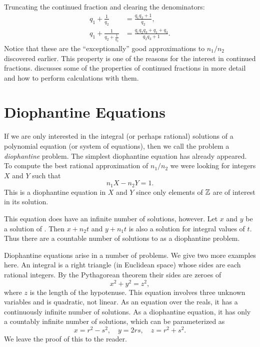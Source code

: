 Truncating the continued fraction and clearing the denominators:
\[
\begin{aligned}
q_1 + \frac{1}{q_2} & = \frac{q_1 q_2 + 1}{q_2}, \\
q_1 + \frac{1}{\displaystyle q_2 + 
    \frac{1}{\displaystyle q_3}} & = 
  \frac{q_1 q_2 q_3 + q_1 + q_3}{q_2 q_3 + 1}.
\end{aligned}
\]
Notice that these are the ``exceptionally'' good approximations to
$n_1/n_2$ discovered earlier.  This property is one of the reasons for
the interest in continued fractions.   discusses some
of the properties of continued fractions in more detail and how to
perform calculations with them.

\section{Diophantine Equations}
\label{Euclid:DE:Sec}

If we are only interested in the integral (or perhaps rational)
solutions of a polynomial equation (or system of equations), then we
call the problem a {\em diophantine} problem. The simplest diophantine equation has already appeared.  To
compute the best rational approximation of $n_1/n_2$ we were looking
for integers $X$ and $Y$ such that
\begin{equation}\label{Euclid:Approx:Eq}
n_1 X - n_2 Y = 1.
\end{equation}
This is a  diophantine equation in $X$ and $Y$ since only elements of
$\mathbb{Z}$ are of interest in its solution.

This equation does have an infinite number of solutions, however.  Let
$x$ and $y$ be a solution of .  Then $x+n_2
t$ and $y+ n_1 t$ is also a solution for integral values of $t$.  Thus
there are a countable number of solutions to 
as a diophantine problem.

Diophantine equations arise in a number of problems.  We give two more
examples here.  An integral  is a right
triangle (in Euclidean space) whose sides are each rational integers.
By the Pythagorean theorem their sides are zeroes of
\[
x^2 + y^2 = z^2,
\]
where $z$ is the length of the hypotenuse.  This equation involves three
unknown variables and is quadratic, not linear.  As an equation over
the reals, it has a continuously infinite number of solutions.  As a
diophantine equation, it has only a countably infinite number of
solutions, which can be parameterized as 
\begin{equation}\label{PythagEq:Soln:Eq}
x = r^2 - s^2, \quad y = 2rs, \quad z = r^2 + s^2.
\end{equation}
We leave the proof of this to the reader.  

